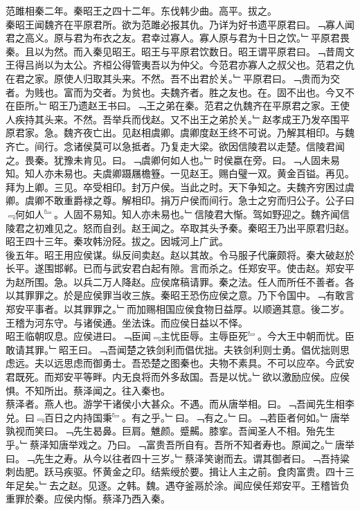 \documentclass{zhvt-classic}
\begin{document}
\hspace*{2em}范雎相秦二年。秦昭王之四十二年。东伐韩少曲。高平。拔之。\\
\hspace*{2em}秦昭王闻魏齐在平原君所。欲为范雎必报其仇。乃详为好书遗平原君曰。﹁寡人闻君之高义。原与君为布衣之友。君幸过寡人。寡人原与君为十日之饮。﹂平原君畏秦。且以为然。而入秦见昭王。昭王与平原君饮数日。昭王谓平原君曰。﹁昔周文王得吕尚以为太公。齐桓公得管夷吾以为仲父。今范君亦寡人之叔父也。范君之仇在君之家。原使人归取其头来。不然。吾不出君於关。﹂平原君曰。﹁贵而为交者。为贱也。富而为交者。为贫也。夫魏齐者。胜之友也。在。固不出也。今又不在臣所。﹂昭王乃遗赵王书曰。﹁王之弟在秦。范君之仇魏齐在平原君之家。王使人疾持其头来。不然。吾举兵而伐赵。又不出王之弟於关。﹂赵孝成王乃发卒围平原君家。急。魏齐夜亡出。见赵相虞卿。虞卿度赵王终不可说。乃解其相印。与魏齐亡。间行。念诸侯莫可以急抵者。乃复走大梁。欲因信陵君以走楚。信陵君闻之。畏秦。犹豫未肯见。曰。﹁虞卿何如人也。﹂时侯嬴在旁。曰。﹁人固未易知。知人亦未易也。夫虞卿蹑屩檐簦。一见赵王。赐白璧一双。黄金百镒。再见。拜为上卿。三见。卒受相印。封万户侯。当此之时。天下争知之。夫魏齐穷困过虞卿。虞卿不敢重爵禄之尊。解相印。捐万户侯而间行。急士之穷而归公子。公子曰﹃何如人﹄。人固不易知。知人亦未易也。﹂信陵君大惭。驾如野迎之。魏齐闻信陵君之初难见之。怒而自刭。赵王闻之。卒取其头予秦。秦昭王乃出平原君归赵。\\
\hspace*{2em}昭王四十三年。秦攻韩汾陉。拔之。因城河上广武。\\
\hspace*{2em}後五年。昭王用应侯谋。纵反间卖赵。赵以其故。令马服子代廉颇将。秦大破赵於长平。遂围邯郸。已而与武安君白起有隙。言而杀之。任郑安平。使击赵。郑安平为赵所围。急。以兵二万人降赵。应侯席稿请罪。秦之法。任人而所任不善者。各以其罪罪之。於是应侯罪当收三族。秦昭王恐伤应侯之意。乃下令国中。﹁有敢言郑安平事者。以其罪罪之。﹂而加赐相国应侯食物日益厚。以顺適其意。後二岁。王稽为河东守。与诸侯通。坐法诛。而应侯日益以不怿。\\
\hspace*{2em}昭王临朝叹息。应侯进曰。﹁臣闻﹃主忧臣辱。主辱臣死﹄。今大王中朝而忧。臣敢请其罪。﹂昭王曰。﹁吾闻楚之铁剑利而倡优拙。夫铁剑利则士勇。倡优拙则思虑远。夫以远思虑而御勇士。吾恐楚之图秦也。夫物不素具。不可以应卒。今武安君既死。而郑安平等畔。内无良将而外多敌国。吾是以忧。﹂欲以激励应侯。应侯惧。不知所出。蔡泽闻之。往入秦也。\\
\hspace*{2em}蔡泽者。燕人也。游学干诸侯小大甚众。不遇。而从唐举相。曰。﹁吾闻先生相李兑。曰﹃百日之内持国秉﹄。有之乎。﹂曰。﹁有之。﹂曰。﹁若臣者何如。﹂唐举孰视而笑曰。﹁先生曷鼻。巨肩。魋颜。蹙齃。膝挛。吾闻圣人不相。殆先生乎。﹂蔡泽知唐举戏之。乃曰。﹁富贵吾所自有。吾所不知者寿也。原闻之。﹂唐举曰。﹁先生之寿。从今以往者四十三岁。﹂蔡泽笑谢而去。谓其御者曰。﹁吾持粱刺齿肥。跃马疾驱。怀黄金之印。结紫绶於要。揖让人主之前。食肉富贵。四十三年足矣。﹂去之赵。见逐。之韩。魏。遇夺釜鬲於涂。闻应侯任郑安平。王稽皆负重罪於秦。应侯内惭。蔡泽乃西入秦。\\
\end{document}
